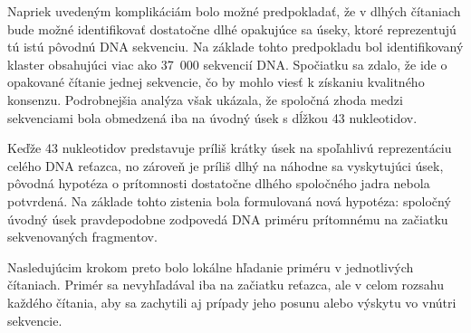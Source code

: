 Napriek uvedeným komplikáciám bolo možné predpokladať, že v dlhých čítaniach bude možné identifikovať dostatočne dlhé opakujúce sa úseky, ktoré reprezentujú tú istú pôvodnú DNA sekvenciu.
Na základe tohto predpokladu bol identifikovaný klaster obsahujúci viac ako 37~000 sekvencií DNA.
Spočiatku sa zdalo, že ide o opakované čítanie jednej sekvencie, čo by mohlo viesť k získaniu kvalitného konsenzu.
Podrobnejšia analýza však ukázala, že spoločná zhoda medzi sekvenciami bola obmedzená iba na úvodný úsek s dĺžkou 43 nukleotidov.

Keďže 43 nukleotidov predstavuje príliš krátky úsek na spoľahlivú reprezentáciu celého DNA reťazca, no zároveň je príliš dlhý na náhodne sa vyskytujúci úsek, pôvodná hypotéza o prítomnosti dostatočne dlhého spoločného jadra nebola potvrdená.
Na základe tohto zistenia bola formulovaná nová hypotéza: spoločný úvodný úsek pravdepodobne zodpovedá DNA priméru prítomnému na začiatku sekvenovaných fragmentov.

Nasledujúcim krokom preto bolo lokálne hľadanie priméru v jednotlivých čítaniach.
Primér sa nevyhľadával iba na začiatku reťazca, ale v celom rozsahu každého čítania, aby sa zachytili aj prípady jeho posunu alebo výskytu vo vnútri sekvencie.

